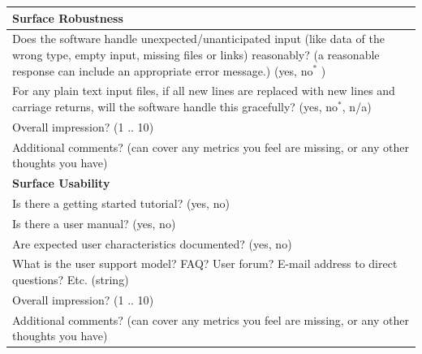 \documentclass[letterpaper,cleveref]{lipics-v2019}
\begin{document}
\def\arraystretch{1.4}
\begin{tabular}{p{14cm}}
	\hline		
	\textbf{Surface Robustness}\\
	\hline
	Does the software handle unexpected/unanticipated input (like data of the
	wrong type, empty input, missing files or links) reasonably? (a reasonable
	response can include an appropriate error message.) ({yes, no$^*$ })\\
	For any plain text input files, if all new lines are replaced with new lines
	and carriage returns, will the software handle this gracefully? ({yes, no$^*$,
	n/a})\\
	Overall impression? ({1 .. 10})\\
	Additional comments? (can cover any metrics you feel are missing, or any other
	thoughts you have)\\
	\hline		
	\textbf{Surface Usability}\\
	\hline
	Is there a getting started tutorial? ({yes, no})\\
	Is there a user manual? ({yes, no})\\
	Are expected user characteristics documented? ({yes, no})\\
	What is the user support model? FAQ? User forum? E-mail address to direct
	questions? Etc. (string)\\
	Overall impression? ({1 .. 10})\\
	Additional comments? (can cover any metrics you feel are missing, or any other
	thoughts you have)\\
	\hline
\end{tabular}
\end{document}
